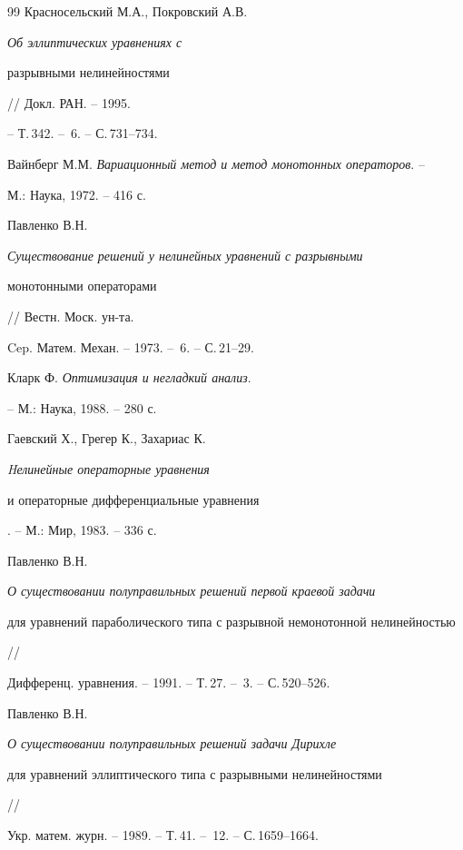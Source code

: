 \begin{thebibliography}{99}
Красносельский М.А., Покровский А.В. {\em Об эллиптических уравнениях с


разрывными нелинейностями} // Докл. РАН. -- 1995.


-- Т.\,342. -- \No\,6. -- С.\,731--734.







Вайнберг М.М. {\em Вариационный метод и метод монотонных операторов}. -- 


М.: Наука, 1972. -- 416 с.







Павленко В.Н. {\em Существование решений у нелинейных уравнений с разрывными


монотонными операторами} // Вестн. Моск. ун-та. 


Cep. Матем. Механ. -- 1973. -- \No\,6. -- С.\,21--29.







Кларк Ф. {\em Оптимизация и негладкий анализ}.


-- М.: Наука, 1988. -- 280 с.







Гаевский Х., Грегер К., Захариас К. {\em Hелинейные операторные уравнения


и операторные дифференциальные уравнения}. -- М.: Мир, 1983. -- 336 с.







Павленко В.Н. {\em О существовании полуправильных решений первой краевой задачи


для уравнений параболического типа с разрывной немонотонной нелинейностью} //


Дифференц. уравнения. -- 1991. -- Т.\,27. -- \No\,3. -- С.\,520--526.







Павленко В.Н. {\em О существовании полуправильных решений задачи Дирихле


для уравнений эллиптического типа с разрывными нелинейностями} // 


Укр. матем. журн. -- 1989. -- Т.\,41. -- \No\,12. -- С.\,1659--1664.






\end{thebibliography}

